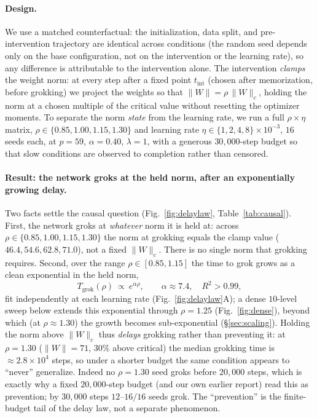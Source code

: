 \documentclass[10pt,twocolumn]{article}
\newcommand{\lam}{\lambda}
\newcommand{\Wc}{\|W\|_{c}}
\newcommand{\Tgrok}{T_{\mathrm{grok}}}
\begin{document}
\paragraph{Design.}
We use a matched counterfactual: the initialization, data split, and pre-intervention trajectory are
identical across conditions (the random seed depends only on the base configuration, not on the
intervention or the learning rate), so any difference is attributable to the intervention alone. The
intervention \emph{clamps} the weight norm: at every step after a fixed point $t_{\mathrm{int}}$ (chosen
after memorization, before grokking) we project the weights so that $\|W\|=\rho\,\Wc$, holding the norm at a
chosen multiple of the critical value without resetting the optimizer moments. To separate the norm
\emph{state} from the learning rate, we run a full $\rho\times\eta$ matrix, $\rho\in\{0.85,1.00,1.15,1.30\}$
and learning rate $\eta\in\{1,2,4,8\}\times10^{-3}$, $16$ seeds each, at $p=59$, $\alpha=0.40$, $\lam=1$,
with a generous $30{,}000$-step budget so that slow conditions are observed to completion rather than
censored.

\paragraph{Result: the network groks at the held norm, after an exponentially growing delay.}
Two facts settle the causal question (Fig.~\ref{fig:delaylaw}, Table~\ref{tab:causal}). First, the network
groks at \emph{whatever} norm it is held at: across $\rho\in\{0.85,1.00,1.15,1.30\}$ the norm at grokking
equals the clamp value ($46.4,54.6,62.8,71.0$), not a fixed $\Wc$. There is no single norm that grokking
requires. Second, over the range $\rho\in[0.85,1.15]$ the time to grok grows as a clean exponential in the
held norm,
\begin{equation}
\Tgrok(\rho)\ \propto\ e^{\alpha\rho},\qquad \alpha\approx 7.4,\quad R^2>0.99,
\label{eq:delaylaw}
\end{equation}
fit independently at each learning rate (Fig.~\ref{fig:delaylaw}A); a dense $10$-level sweep below extends
this exponential through $\rho=1.25$ (Fig.~\ref{fig:dense}), beyond which (at $\rho\approx1.30$) the growth
becomes sub-exponential (\S\ref{sec:scaling}). Holding the norm above $\Wc$ thus \emph{delays} grokking rather than
preventing it: at $\rho=1.30$ ($\|W\|=71$, $30\%$ above critical) the median grokking time is
$\approx\!2.8\times10^{4}$ steps, so under a shorter budget the same condition appears to ``never''
generalize. Indeed no $\rho=1.30$ seed groks before $20{,}000$ steps, which is exactly why a fixed
$20{,}000$-step budget (and our own earlier report) read this as prevention; by $30{,}000$ steps
$12$--$16/16$ seeds grok. The ``prevention'' is the finite-budget tail of the delay law, not a separate
phenomenon.
\end{document}
